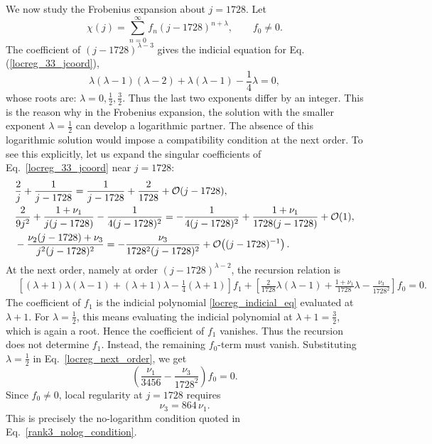 \documentclass[11pt]{article}
\newcommand{\cO}{{\cal O}}
\newcommand{\eref}[1]{Eq.\,(\ref{#1})}
\begin{document}
We now study the Frobenius expansion about \(j=1728\). Let
\begin{equation}
\chi(j)=\sum_{n=0}^{\infty}f_n (j-1728)^{n+\lambda},
\qquad f_0\neq0 .
\label{locreg_frob_ansatz}
\end{equation}
The coefficient of \((j-1728)^{\lambda-3}\) gives the indicial equation for \eref{locreg_33_jcoord},
\begin{equation}
\lambda(\lambda-1)(\lambda-2)
+\lambda(\lambda-1)-\frac{1}{4}\lambda=0 ,
\label{locreg_indicial_eq}
\end{equation}
whose roots are: $\lambda = 0, \frac{1}{2}, \frac{3}{2}$. Thus the last two exponents differ by an integer. This is the reason why in the Frobenius expansion, the solution with the smaller exponent \(\lambda=\frac12\) can develop a logarithmic partner. The absence of this logarithmic solution would impose a compatibility condition at the next order. To see this explicitly, let us expand the singular coefficients of
Eq.~\eqref{locreg_33_jcoord} near \(j=1728\):
\begin{equation}
\begin{split}
&\frac{2}{j}+\frac{1}{j-1728}
=
\frac{1}{j-1728}+\frac{2}{1728}+\cO(j-1728), \\
&\frac{2}{9j^2}
+\frac{1+\nu_1}{j(j-1728)}
-\frac{1}{4(j-1728)^2}
=
-\frac{1}{4(j-1728)^2}
+\frac{1+\nu_1}{1728(j-1728)}
+\cO(1), \\
&-\frac{\nu_2(j-1728)+\nu_3}{j^2(j-1728)^2}
=
-\frac{\nu_3}{1728^2(j-1728)^2}
+\cO\!\left((j-1728)^{-1}\right).
\end{split} \label{locreg_expand_A}
\end{equation}
At the next order, namely at order \((j-1728)^{\lambda-2}\), the recursion
relation is
\begin{equation}
\begin{split}
&\left[
(\lambda+1)\lambda(\lambda-1)
+(\lambda+1)\lambda
-\frac14(\lambda+1)
\right]f_1 
+\left[
\frac{2}{1728}\lambda(\lambda-1)
+\frac{1+\nu_1}{1728}\lambda
-\frac{\nu_3}{1728^2}
\right]f_0=0 .
\end{split}
\label{locreg_next_order}
\end{equation}
The coefficient of \(f_1\) is the indicial polynomial
\eqref{locreg_indicial_eq} evaluated at \(\lambda+1\). For
\(\lambda=\frac12\), this means evaluating the indicial polynomial at
\(\lambda+1=\frac32\), which is again a root. Hence the coefficient of
\(f_1\) vanishes. Thus the recursion does not determine \(f_1\). Instead, the remaining \(f_0\)-term must vanish. Substituting \(\lambda=\frac12\) in Eq.~\eqref{locreg_next_order}, we get
\begin{equation}
\left(
\frac{\nu_1}{3456}
-\frac{\nu_3}{1728^2}
\right)f_0=0 .
\label{locreg_compatibility}
\end{equation}
Since \(f_0\neq0\), local regularity at \(j=1728\) requires
\begin{equation}
\nu_3=864\,\nu_1 .
\label{locreg_nolog_final}
\end{equation}
This is precisely the no-logarithm condition quoted in Eq.~\eqref{rank3_nolog_condition}.
\end{document}

